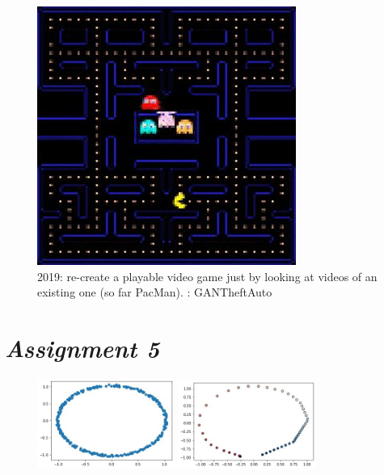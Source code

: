 \begin{figure}[ht]
	\centering
	\includegraphics[width=0.33\linewidth]{figure_ml/pacman.png}
	\caption{2019: re-create a		playable video game	just by looking at videos of an existing one (so far PacMan). : GANTheftAuto}
\end{figure}

\newpage

\section{\textit{Assignment 5}}

\begin{figure}
	\includegraphics[width=0.4\textwidth]{figure_ml/ass5_1.png}
	\includegraphics[width=0.4\textwidth]{figure_ml/ass5_2.png}
\end{figure} 


